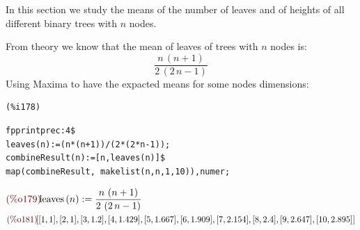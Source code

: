 In this section we study the means of the number of leaves and of
heights of all different binary trees with $n$ nodes.

From theory we know that the mean of leaves of trees with $n$ nodes
is:
\begin{displaymath}
  \frac{n\,\left( n+1\right)  }{2\,\left( 2\,n-1\right) }
\end{displaymath}
Using Maxima to have the expacted means for some nodes dimensions:

\noindent
\begin{minipage}[t]{8ex}{\color{red}\bf
\begin{verbatim}
(%i178) 
\end{verbatim}}
\end{minipage}
\begin{minipage}[t]{\textwidth}{\color{blue}
\begin{verbatim}
fpprintprec:4$
leaves(n):=(n*(n+1))/(2*(2*n-1));
combineResult(n):=[n,leaves(n)]$
map(combineResult, makelist(n,n,1,10)),numer;
\end{verbatim}}
\end{minipage}
\begin{math}\displaystyle
\parbox{8ex}{\color{labelcolor}(\%o179) }
\mathrm{leaves}\left( n\right) :=\frac{n\,\left( n+1\right)
}{2\,\left( 2\,n-1\right) }
\end{math}\\
\begin{math}\displaystyle
\parbox{8ex}{\color{labelcolor}(\%o181) }
[[1,1],[2,1],[3,1.2],[4,1.429],[5,1.667],[6,1.909],[7,2.154],[8,2.4],
[9,2.647],[10,2.895]]
\end{math}

\begin{table}[!ht]
  \label{table:means-of-leaves-height}
  \begin{center}
  \end{center}
  \caption{Theoretical and empirical means for leaves and height}
\end{table}

